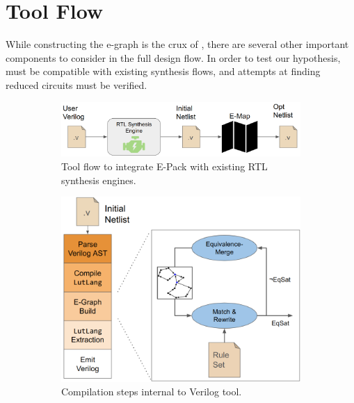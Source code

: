 \section{Tool Flow}\label{sec:flow}

While constructing the e-graph is the crux of \shortname{}, there are several
other important components to consider in the full design flow. In order to
test our hypothesis, \shortname{} must be compatible with existing synthesis
flows, and attempts at finding reduced circuits must be verified.

\begin{figure}
    \begin{subfigure}{0.47\textwidth}
        \centering
        \includegraphics[width=\textwidth]{img/flow.png}
        \caption{Tool flow to integrate E-Pack with existing RTL synthesis engines.}\label{fig:flow:rtl}
        \Description[]{}
    \end{subfigure}
    \hfill\vspace{4mm}
    \begin{subfigure}{0.47\textwidth}
        \centering
        \includegraphics[width=\textwidth]{img/egraph.png}
        \caption{Compilation steps internal to \shortname{} Verilog tool.}\label{fig:flow:egraph}
        \Description[]{}
    \end{subfigure}
    \caption{}\label{fig:flow}
\end{figure}

